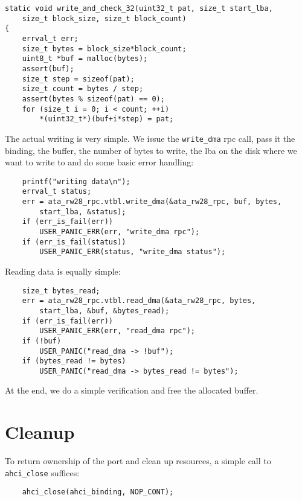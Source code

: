 \begin{lstlisting}
static void write_and_check_32(uint32_t pat, size_t start_lba, 
    size_t block_size, size_t block_count)
{
    errval_t err;
    size_t bytes = block_size*block_count;
    uint8_t *buf = malloc(bytes);
    assert(buf);
    size_t step = sizeof(pat);
    size_t count = bytes / step;
    assert(bytes % sizeof(pat) == 0);
    for (size_t i = 0; i < count; ++i)
        *(uint32_t*)(buf+i*step) = pat;
\end{lstlisting}

The actual writing is very simple. We issue the \lstinline+write_dma+ \acs{rpc}
call, pass it the binding, the buffer, the number of bytes to write, the
\ac{lba} on the disk where we want to write to and do some basic error
handling:

\begin{lstlisting}
    printf("writing data\n");
    errval_t status;
    err = ata_rw28_rpc.vtbl.write_dma(&ata_rw28_rpc, buf, bytes, 
        start_lba, &status);
    if (err_is_fail(err))
        USER_PANIC_ERR(err, "write_dma rpc");
    if (err_is_fail(status))
        USER_PANIC_ERR(status, "write_dma status");
\end{lstlisting}

Reading data is equally simple:

\begin{lstlisting}
    size_t bytes_read;
    err = ata_rw28_rpc.vtbl.read_dma(&ata_rw28_rpc, bytes, 
        start_lba, &buf, &bytes_read);
    if (err_is_fail(err))
        USER_PANIC_ERR(err, "read_dma rpc");
    if (!buf)
        USER_PANIC("read_dma -> !buf");
    if (bytes_read != bytes)
        USER_PANIC("read_dma -> bytes_read != bytes");
\end{lstlisting}

At the end, we do a simple verification and free the allocated buffer.

\section{Cleanup}

To return ownership of the port and clean up resources, a simple call to
\lstinline+ahci_close+ suffices:

\begin{lstlisting}
    ahci_close(ahci_binding, NOP_CONT);
\end{lstlisting}
